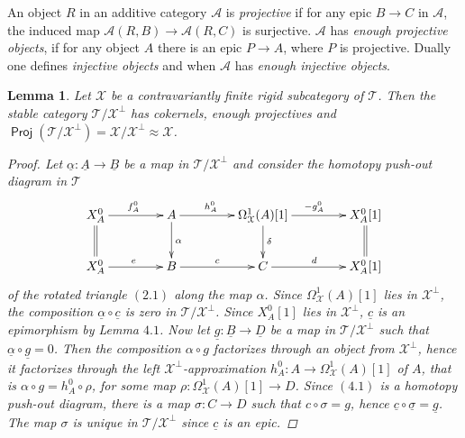 \documentclass[oneside, a4paper,reqno]{amsart}
\numberwithin{equation}{section}
\newtheorem{lem}[thm]{Lemma}
\theoremstyle{definition}
\begin{document}
An object $R$ in an additive category ${\mathscr A}$ is {\em projective} if for any epic $B {\longrightarrow} C$ in ${\mathscr A}$, the induced map ${\mathscr A}(R,B) {\longrightarrow} {\mathscr A}(R,C)$ is surjective. ${\mathscr A}$ has {\em enough projective objects}, if for any object $A$ there is an epic $P {\longrightarrow} A$, where $P$ is projective. Dually one defines {\em injective objects} and when ${\mathscr A}$ has {\em enough injective objects}. 

\begin{lem} Let ${\mathcal X}$ be a contravariantly finite rigid subcategory of ${\mathcal T}$. Then the stable category ${\mathcal T}/{\mathcal X}^{\bot}$ has cokernels, enough projectives and    $\operatorname*{\mathsf{Proj}}({\mathcal T}/{\mathcal X}^{\bot}) = {\mathcal X}/{\mathcal X}^{\bot} \approx {\mathcal X}$.
 \begin{proof}  Let $\underline{\alpha} \colon {\underline A} {\longrightarrow} {\underline B}$ be a map in ${\mathcal T}/{\mathcal X}^{\bot}$ and consider the homotopy push-out diagram in ${\mathcal T}$  
 \begin{equation}
  \xymatrix@C=1.5cm{
    X^{0}_{A}  \ar[r]^{f^{0}_{A}}  \ar@{=}[d]  &  
   A \ar[r]^{h^{0}_{A} \ \ \ }\ar[d]^{\alpha}&
    \Omega^{1}_{\mathcal X}(A)[1] \ar[d]^{\delta} \ar[r]^{\ \ -g^{0}_{A} \ \ }&
    X^{0}_{A}[1] \ar@{=}[d] \\
    X^{0}_{A} \ar[r]^{e}& B \ar[r]^{c}& C \ar[r]^{d} & X^{0}_{A}[1]}
\end{equation}  
of the rotated triangle $(2.1)$ along the map $\alpha$. Since $\Omega^{1}_{\mathcal X}(A)[1]$ lies in ${\mathcal X}^{\bot}$, the composition $\underline{\alpha} \circ \underline{c}$ is zero in ${\mathcal T}/{\mathcal X}^{\bot}$. Since $X^{0}_{A}[1]$ lies in ${\mathcal X}^{\bot}$, $\underline{c}$ is an epimorphism by Lemma $4.1$.  Now let $\underline{g} \colon \underline{B} {\longrightarrow} \underline{D}$ be a map in ${\mathcal T}/{\mathcal X}^{\bot}$ such that $\underline{\alpha} \circ \underline{g} = 0$. Then the composition $\alpha \circ g$ factorizes through an object from ${\mathcal X}^{\bot}$, hence  it factorizes through the left ${\mathcal X}^{\bot}$-approximation $h^{0}_{A} \colon A {\longrightarrow} \Omega^{1}_{\mathcal X}(A)[1]$ of $A$, that is $\alpha \circ g = h^{0}_{A} \circ \rho$, for some map $\rho \colon \Omega^{1}_{\mathcal X}(A)[1] {\longrightarrow} D$. Since $(4.1)$ is a homotopy push-out diagram, there is a map $\sigma \colon C {\longrightarrow} D$ such that $c\circ \sigma = g$, hence $\underline{c} \circ \underline{\sigma} = \underline{g}$.  The map $\sigma$ is unique in ${\mathcal T}/{\mathcal X}^{\bot}$ since $\underline{c}$ is an epic. 

\end{proof}
\end{lem}
\end{document}
